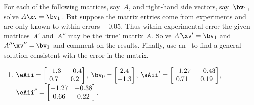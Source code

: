 





\sectionExercises



\begin{exercise} \label{ex:errmats} 
For each of the following matrices, say~\(A\), and right-hand side vectors, say~\(\bv_1\),
solve \(A\xv=\bv_1\)\,.
But suppose the matrix entries come from experiments and are only known to within errors~\(\pm0.05\).
Thus within experimental error the given matrices~\(A'\) and~\(A''\) may be the `true' matrix~\(A\).
Solve \(A'\xv'=\bv_1\) and \(A''\xv''=\bv_1\) and comment on the results.
Finally, use an \svd\ to find a general solution consistent with the error in the matrix.

\begin{enumerate} \raggedright
\item \(\eAii=\begin{bmatrix} -1.3&-0.4\\0.7&0.2 \end{bmatrix}\),
\(\bv_{\arabic{enumii}}=\begin{bmatrix} 2.4\\-1.3 \end{bmatrix}\), 
\(\eAii'=\begin{bmatrix} -1.27&-0.43\\0.71&0.19 \end{bmatrix}\),
\(\eAii''=\begin{bmatrix} -1.27&-0.38\\0.66&0.22 \end{bmatrix}\).


\end{enumerate}
\end{exercise}
